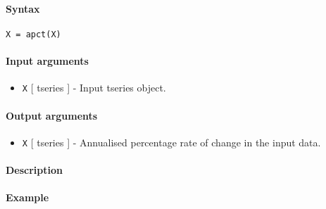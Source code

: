 


	\paragraph{Syntax}

\begin{verbatim}
X = apct(X)
\end{verbatim}

\paragraph{Input arguments}

\begin{itemize}
\itemsep1pt\parskip0pt
\item
  \texttt{X} {[} tseries {]} - Input tseries object.
\end{itemize}

\paragraph{Output arguments}

\begin{itemize}
\itemsep1pt\parskip0pt
\item
  \texttt{X} {[} tseries {]} - Annualised percentage rate of change in
  the input data.
\end{itemize}

\paragraph{Description}

\paragraph{Example}


